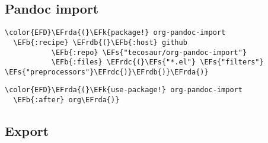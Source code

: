 \documentclass[12pt]{article}
\theoremstyle{plain}%
\theoremstyle{definition}
\theoremstyle{remark}
\newcommand{\EFs}[1]{\textcolor{EFs}{#1}} %
\newcommand{\EFk}[1]{\textcolor{EFk}{#1}} %
\newcommand{\EFb}[1]{\textcolor{EFb}{#1}} %
\newcommand{\EFrda}[1]{\textcolor{EFrda}{#1}} %
\newcommand{\EFrdb}[1]{\textcolor{EFrdb}{#1}} %
\newcommand{\EFrdc}[1]{\textcolor{EFrdc}{#1}} %
\begin{document}
\subsection{Pandoc import}
\label{sec:org1600e8d}
\begin{Code}
\begin{Verbatim}
\color{EFD}\EFrda{(}\EFk{package!} org-pandoc-import
  \EFb{:recipe} \EFrdb{(}\EFb{:host} github
           \EFb{:repo} \EFs{"tecosaur/org-pandoc-import"}
           \EFb{:files} \EFrdc{(}\EFs{"*.el"} \EFs{"filters"} \EFs{"preprocessors"}\EFrdc{)}\EFrdb{)}\EFrda{)}
\end{Verbatim}
\end{Code}
\begin{Code}
\begin{Verbatim}
\color{EFD}\EFrda{(}\EFk{use-package!} org-pandoc-import
  \EFb{:after} org\EFrda{)}
\end{Verbatim}
\end{Code}
\subsection{Export}
\label{sec:org17b71c8}
\end{document}
